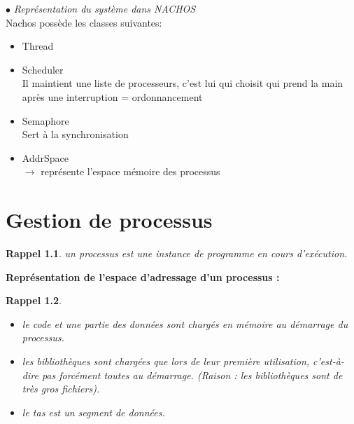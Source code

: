 \documentclass[12pt,a4paper]{report}
\newtheorem*{rap}{Rappel}
\begin{document}
$\bullet$ \textit{Représentation du système dans NACHOS\\}
Nachos possède les classes suivantes:
\begin{itemize}
\item Thread
\item Scheduler\\
Il maintient une liste de processeurs, c'est lui qui choisit qui prend la main après une interruption = ordonnancement
\item Semaphore\\
Sert à la synchronisation
\item AddrSpace\\
$\rightarrow$ représente l'espace mémoire des processus
\end{itemize}


\chapter{Gestion de processus}

\begin{rap} un processus est une instance de programme en cours
 d'exécution. \end{rap}

\textbf{Représentation de l'espace d'adressage d'un processus :}
\begin{center}
\end{center}

\begin{rap} 
\begin{itemize}
\item le code et une partie des données sont chargés en mémoire au démarrage du processus.
\item les bibliothèques sont chargées que lors de leur première utilisation, c'est-à-dire pas forcément toutes au démarrage. (Raison : les bibliothèques sont de très gros fichiers). 
\item le tas est un segment de données.
\\
\end{itemize}  
\end{rap}
\end{document}
